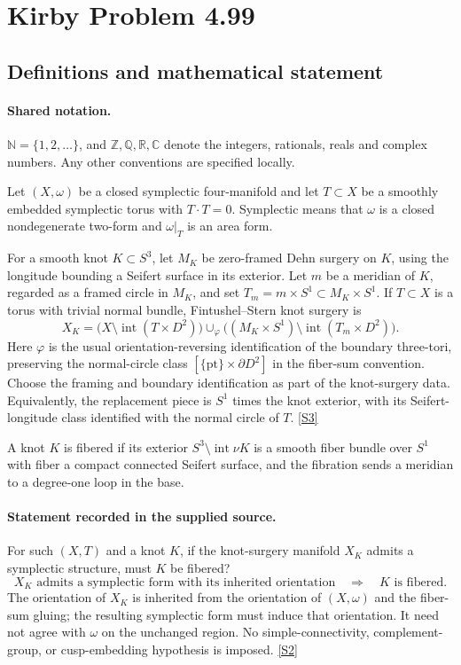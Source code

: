 \documentclass[11pt]{article}
\newcommand{\sref}[2]{\hyperlink{source:#1:#2}{[S#2]}}
\begin{document}
\section{Kirby Problem 4.99}\label{statement}

\subsection{Definitions and mathematical statement}

\paragraph{Shared notation.}$\mathbb N=\{1,2,\ldots\}$, and $\mathbb Z,\mathbb Q,\mathbb R,\mathbb C$ denote the integers, rationals, reals and complex numbers. Any other conventions are specified locally.


Let $(X,\omega)$ be a closed symplectic four-manifold and let $T\subset X$ be a smoothly embedded symplectic torus with $T\cdot T=0$. Symplectic means that $\omega$ is a closed nondegenerate two-form and $\omega|_T$ is an area form. 

For a smooth knot $K\subset S^3$, let $M_K$ be zero-framed Dehn surgery on $K$, using the longitude bounding a Seifert surface in its exterior. Let $m$ be a meridian of $K$, regarded as a framed circle in $M_K$, and set $T_m=m\times S^1\subset M_K\times S^1$. If $T\subset X$ is a torus with trivial normal bundle, Fintushel--Stern knot surgery is
\[
X_K=\bigl(X\setminus\operatorname{int}(T\times D^2)\bigr)
\cup_\varphi\bigl((M_K\times S^1)\setminus\operatorname{int}(T_m\times D^2)\bigr).
\]
Here $\varphi$ is the usual orientation-reversing identification of the boundary three-tori, preserving the normal-circle class $[\{\mathrm{pt}\}\times\partial D^2]$ in the fiber-sum convention. Choose the framing and boundary identification as part of the knot-surgery data. Equivalently, the replacement piece is $S^1$ times the knot exterior, with its Seifert-longitude class identified with the normal circle of $T$. \sref{statement}{3}

A knot $K$ is fibered if its exterior $S^3\setminus\operatorname{int}\nu K$ is a smooth fiber bundle over $S^1$ with fiber a compact connected Seifert surface, and the fibration sends a meridian to a degree-one loop in the base.
\paragraph{Statement recorded in the supplied source.}
For such $(X,T)$ and a knot $K$, if the knot-surgery manifold $X_K$ admits a symplectic structure, must $K$ be fibered?
\[
 X_K\text{ admits a symplectic form with its inherited orientation}\quad\Longrightarrow\quad K\text{ is fibered}.
\]
The orientation of $X_K$ is inherited from the orientation of $(X,\omega)$ and the fiber-sum gluing; the resulting symplectic form must induce that orientation. It need not agree with $\omega$ on the unchanged region. No simple-connectivity, complement-group, or cusp-embedding hypothesis is imposed. \sref{statement}{2}
\end{document}

